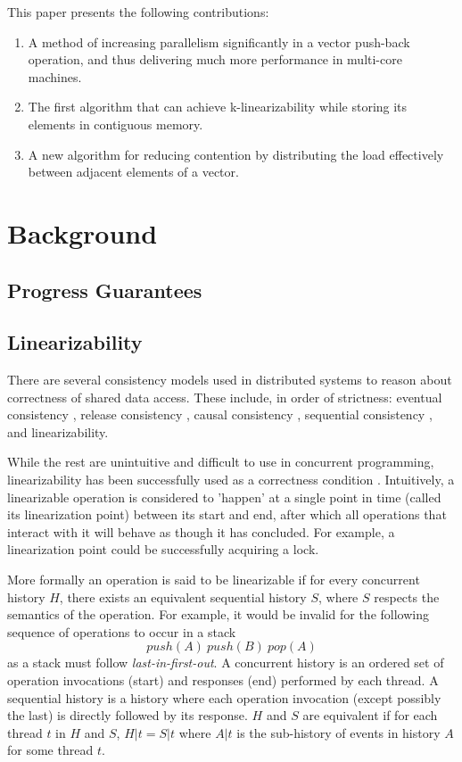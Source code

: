 \documentclass{sigplanconf}
\begin{document}
This paper presents the following contributions:
\begin{enumerate}
\item A method of increasing parallelism significantly in a vector push-back
operation, and thus delivering much more performance in multi-core
machines.
\item The first algorithm that can achieve k-linearizability while storing
its elements in contiguous memory.
\item A new algorithm for reducing contention by distributing the load effectively
between adjacent elements of a vector.
\end{enumerate}

\section{Background}


\subsection{Progress Guarantees}


\subsection{Linearizability}

There are several consistency models used in distributed systems to reason about correctness of shared data access. These include, in order of strictness: eventual consistency \cite{cm-eventual}, release consistency \cite{cm-release}, causal consistency \cite{cm-causal}, sequential consistency \cite{cm-sequential}, and linearizability.

While the rest are unintuitive and difficult to use in concurrent programming, linearizability has been successfully used as a correctness condition \cite{classic-linearizability}. Intuitively, a linearizable operation is considered to 'happen' at a single point in time (called its linearization point) between its start and end, after which all operations that interact with it will behave as though it has concluded. For example, a linearization point could be successfully acquiring a lock.

More formally an operation is said to be linearizable if for every concurrent history $H$, there exists an equivalent sequential history $S$, where $S$ respects the semantics of the operation. For example, it would be invalid for the following sequence of operations to occur in a stack
$$push(A)\ push(B)\ pop(A)$$
as a stack must follow \emph{last-in-first-out}.
A concurrent history is an ordered set of operation invocations (start) and responses (end) performed by each thread. A sequential history is a history where each operation invocation (except possibly the last) is directly followed by its response.
$H$ and $S$ are equivalent if for each thread $t$ in $H$ and $S$, $H \vert t = S \vert t$ where $A\vert t$ is the sub-history of events in history $A$ for some thread $t$.
\end{document}
